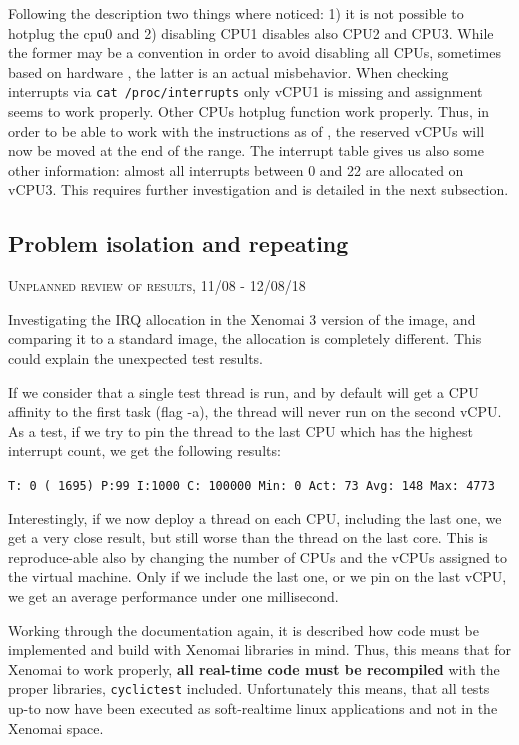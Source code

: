 \documentclass[]{scrartcl}
\begin{document}
Following the description two things where noticed: 1) it is not possible to hotplug the cpu0 and 2) disabling CPU1 disables also CPU2 and CPU3.
While the former may be a convention in order to avoid disabling all CPUs, sometimes based on hardware \cite{lwn01}, the latter is an actual misbehavior. 
When checking interrupts via \texttt{cat /proc/interrupts} only vCPU1 is missing and assignment seems to work properly. Other CPUs hotplug function work properly. 
Thus, in order to be able to work with the instructions as of \cite{lwn01}, the reserved vCPUs will now be moved at the end of the range. 
The interrupt table gives us also some other information: almost all interrupts between 0 and 22 are allocated on vCPU3. This requires further investigation and is detailed in the next subsection.

\subsection{Problem isolation and repeating}
\label{sec:isol}

{\small\textsc{Unplanned review of results, 11/08 - 12/08/18} \bigskip}

Investigating the IRQ allocation in the Xenomai 3 version of the image, and comparing it to a standard image, the allocation is completely different. This could explain the unexpected test results.

If we consider that a single test thread is run, and by default will get a CPU affinity to the first task (flag -a), the thread will never run on the second vCPU. As a test, if we try to pin the thread to the last CPU which has the highest interrupt count, we get the following results:
\bigskip

\noindent \small \texttt{T: 0 ( 1695) P:99 I:1000 C: 100000 Min:      0 Act:   73 Avg:  148 Max:    4773}

Interestingly, if we now deploy a thread on each CPU, including the last one, we get a very close result, but still worse than the thread on the last core. This is reproduce-able also by changing the number of CPUs and the vCPUs assigned to the virtual machine. Only if we include the last one, or we pin on the last vCPU, we get an average performance under one millisecond.

Working through the documentation again, it is described how code must be implemented and build with Xenomai libraries in mind. Thus, this means that for Xenomai to work properly, \textbf{all real-time code must be recompiled} with the proper libraries, \texttt{cyclictest} included. Unfortunately this means, that all tests up-to now have been executed as soft-realtime linux applications and not in the Xenomai space.
\end{document}
